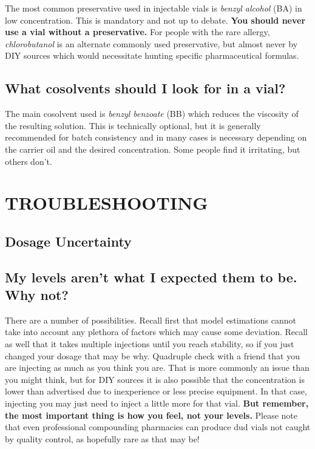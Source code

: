 \documentclass{article}
\begin{document}
The most common preservative used in injectable vials is \textit{benzyl alcohol} (BA) in low concentration. This is mandatory and not up to debate. \textbf{You should never use a vial without a preservative. }For people with the rare allergy, \textit{chlorobutanol }is an alternate commonly used preservative, but almost never by DIY sources which would necessitate hunting specific pharmaceutical formulas.

\subsection{What cosolvents should I look for in a vial?}

The main cosolvent used is \textit{benzyl benzoate} (BB) which reduces the viscosity of the resulting solution. This is technically optional, but it is generally recommended for batch consistency and in many cases is necessary depending on the carrier oil and the desired concentration. Some people find it irritating, but others don’t. 

 

\section{TROUBLESHOOTING}

\subsection*{Dosage Uncertainty}

\subsection{My levels aren’t what I expected them to be. Why not?}

There are a number of possibilities. Recall first that model estimations cannot take into account any plethora of factors which may cause some deviation. Recall as well that it takes multiple injections until you reach stability, so if you just changed your dosage that may be why. Quadruple check with a friend that you are injecting as much as you think you are. That is more commonly an issue than you might think, but for DIY sources it is also possible that the concentration is lower than advertised due to inexperience or less precise equipment. In that case, injecting you may just need to inject a little more for that vial. \textbf{But remember, the most important thing is how you feel, not your levels. }Please note that even professional compounding pharmacies can produce dud vials not caught by quality control, as hopefully rare as that may be!
\end{document}
